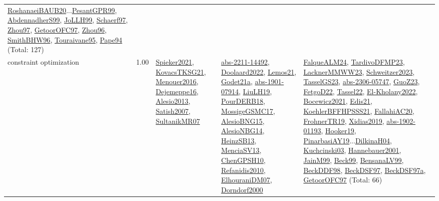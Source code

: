 {\begin{longtable}{p{3cm}r>{\raggedright\arraybackslash}p{6cm}>{\raggedright\arraybackslash}p{6cm}>{\raggedright\arraybackslash}p{8cm}}
\hyperref[detail:RoshanaeiBAUB20]{RoshanaeiBAUB20}...\hyperref[detail:PesantGPR99]{PesantGPR99}, \hyperref[detail:AbdennadherS99]{AbdennadherS99}, \hyperref[detail:JoLLH99]{JoLLH99}, \hyperref[detail:Schaerf97]{Schaerf97}, \hyperref[detail:Zhou97]{Zhou97}, \hyperref[detail:GetoorOFC97]{GetoorOFC97}, \hyperref[detail:Zhou96]{Zhou96}, \hyperref[detail:SmithBHW96]{SmithBHW96}, \hyperref[detail:Touraivane95]{Touraivane95}, \hyperref[detail:Pape94]{Pape94} (Total: 127)\\
\index{constraint optimization}\index{CP!constraint optimization}constraint optimization &  1.00 & \hyperref[detail:Spieker2021]{Spieker2021}, \hyperref[detail:KovacsTKSG21]{KovacsTKSG21}, \hyperref[detail:Menouer2016]{Menouer2016}, \hyperref[detail:Dejemeppe16]{Dejemeppe16}, \hyperref[detail:Alesio2013]{Alesio2013}, \hyperref[detail:Satish2007]{Satish2007}, \hyperref[detail:SultanikMR07]{SultanikMR07} & \hyperref[detail:abs-2211-14492]{abs-2211-14492}, \hyperref[detail:Doolaard2022]{Doolaard2022}, \hyperref[detail:Lemos21]{Lemos21}, \hyperref[detail:Godet21a]{Godet21a}, \hyperref[detail:abs-1901-07914]{abs-1901-07914}, \hyperref[detail:LiuLH19]{LiuLH19}, \hyperref[detail:PourDERB18]{PourDERB18}, \hyperref[detail:MossigeGSMC17]{MossigeGSMC17}, \hyperref[detail:AlesioBNG15]{AlesioBNG15}, \hyperref[detail:AlesioNBG14]{AlesioNBG14}, \hyperref[detail:HeinzSB13]{HeinzSB13}, \hyperref[detail:MenciaSV13]{MenciaSV13}, \hyperref[detail:ChenGPSH10]{ChenGPSH10}, \hyperref[detail:Refanidis2010]{Refanidis2010}, \hyperref[detail:ElhouraniDM07]{ElhouraniDM07}, \hyperref[detail:Dorndorf2000]{Dorndorf2000} & \hyperref[detail:FalqueALM24]{FalqueALM24}, \hyperref[detail:TardivoDFMP23]{TardivoDFMP23}, \hyperref[detail:LacknerMMWW23]{LacknerMMWW23}, \hyperref[detail:Schweitzer2023]{Schweitzer2023}, \hyperref[detail:TasselGS23]{TasselGS23}, \hyperref[detail:abs-2306-05747]{abs-2306-05747}, \hyperref[detail:GuoZ23]{GuoZ23}, \hyperref[detail:FetgoD22]{FetgoD22}, \hyperref[detail:Tassel22]{Tassel22}, \hyperref[detail:El-Kholany2022]{El-Kholany2022}, \hyperref[detail:Bocewicz2021]{Bocewicz2021}, \hyperref[detail:Edis21]{Edis21}, \hyperref[detail:KoehlerBFFHPSSS21]{KoehlerBFFHPSSS21}, \hyperref[detail:FallahiAC20]{FallahiAC20}, \hyperref[detail:FrohnerTR19]{FrohnerTR19}, \hyperref[detail:Xidias2019]{Xidias2019}, \hyperref[detail:abs-1902-01193]{abs-1902-01193}, \hyperref[detail:Hooker19]{Hooker19}, \hyperref[detail:PinarbasiAY19]{PinarbasiAY19}...\hyperref[detail:DilkinaH04]{DilkinaH04}, \hyperref[detail:Kuchcinski03]{Kuchcinski03}, \hyperref[detail:Hannebauer2001]{Hannebauer2001}, \hyperref[detail:JainM99]{JainM99}, \hyperref[detail:Beck99]{Beck99}, \hyperref[detail:BensanaLV99]{BensanaLV99}, \hyperref[detail:BeckDDF98]{BeckDDF98}, \hyperref[detail:BeckDSF97]{BeckDSF97}, \hyperref[detail:BeckDSF97a]{BeckDSF97a}, \hyperref[detail:GetoorOFC97]{GetoorOFC97} (Total: 66)\\

\end{longtable}}
